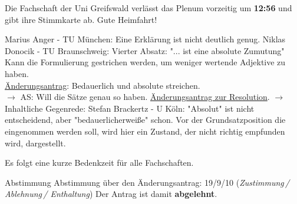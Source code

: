     \begin{info}{}
      Die Fachschaft der Uni Greifswald verlässt das Plenum vorzeitig um \textbf{12:56} und gibt ihre Stimmkarte ab. Gute Heimfahrt!
    \end{info}

    \begin{outline}
      \1 Marius Anger - TU München:  Eine Erklärung ist nicht deutlich genug.
      \1 Niklas Donocik - TU Braunschweig:  Vierter Absatz: "... ist eine absolute Zumutung" Kann die Formulierung gestrichen werden, um weniger wertende Adjektive zu haben. \\ \uline{Änderungsantrag}: Bedauerlich und absolute streichen. \\
      $\rightarrow$ AS: Will die Sätze genau so haben.
      \1 \uline{Änderungsantrag zur Resolution}. $\rightarrow$ Inhaltliche Gegenrede:
        Stefan Brackertz - U Köln:  "Absolut" ist nicht entscheidend, aber "bedauerlicherweiße" schon. Vor der Grundsatzposition die eingenommen werden soll, wird hier ein Zustand, der nicht richtig empfunden wird, dargestellt.
    \end{outline}
    Es folgt eine kurze Bedenkzeit für alle Fachschaften.

    \begin{danger}{Abstimmung}
      Abstimmung über den Änderungsantrag: 19/9/10 (\textit{Zustimmung\,/ Ablehnung\,/ Enthaltung})
      Der Antrag ist damit \textbf{abgelehnt}.
    \end{danger}

